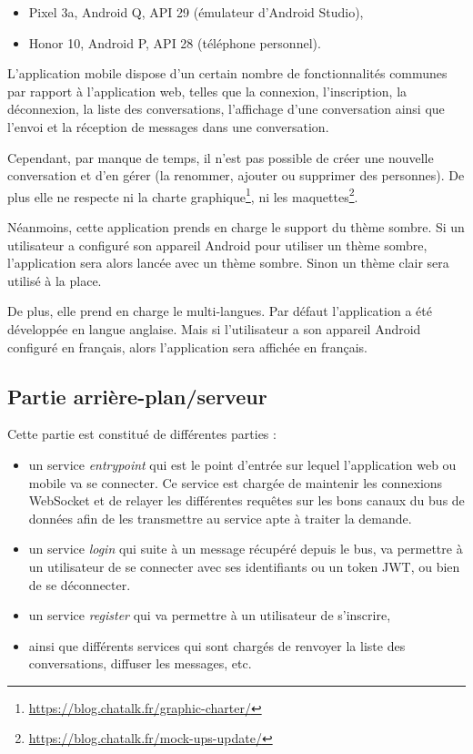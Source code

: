 \begin{itemize}
\item
  Pixel 3a, Android Q, API 29 (émulateur d'Android Studio),
\item
  Honor 10, Android P, API 28 (téléphone personnel).
\end{itemize}

L'application mobile dispose d'un certain nombre de fonctionnalités communes
par rapport à l'application web, telles que la connexion, l'inscription, la
déconnexion, la liste des conversations, l'affichage d'une conversation ainsi
que l'envoi et la réception de messages dans une conversation.

Cependant, par manque de temps, il n'est pas possible de créer une nouvelle
conversation et d'en gérer (la renommer, ajouter ou supprimer des personnes).
De plus elle ne respecte ni la charte
graphique\footnote{\url{https://blog.chatalk.fr/graphic-charter/}}, ni les
maquettes\footnote{\url{https://blog.chatalk.fr/mock-ups-update/}}.

Néanmoins, cette application prends en charge le support du thème sombre. Si
un utilisateur a configuré son appareil Android pour utiliser un thème
sombre, l'application sera alors lancée avec un thème sombre. Sinon un thème
clair sera utilisé à la place.

De plus, elle prend en charge le multi-langues. Par défaut l'application a été
développée en langue anglaise. Mais si l'utilisateur a son appareil Android
configuré en français, alors l'application sera affichée en français.

\subsection{Partie arrière-plan/serveur}

Cette partie est constitué de différentes parties :

\begin{itemize}
\item
  un service \textit{entrypoint} qui est le point d'entrée sur lequel
  l'application web ou mobile va se connecter. Ce service est chargée de
  maintenir les connexions WebSocket et de relayer les différentes
  requêtes sur les bons canaux du bus de données afin de les transmettre
  au service apte à traiter la demande.
\item
  un service \textit{login} qui suite à un message récupéré depuis le bus,
  va permettre à un utilisateur de se connecter avec ses identifiants ou
  un token JWT, ou bien de se déconnecter.
\item
  un service \textit{register} qui va permettre à un utilisateur de
  s'inscrire,
\item
  ainsi que différents services qui sont chargés de renvoyer la liste
  des conversations, diffuser les messages, etc.
\end{itemize}

